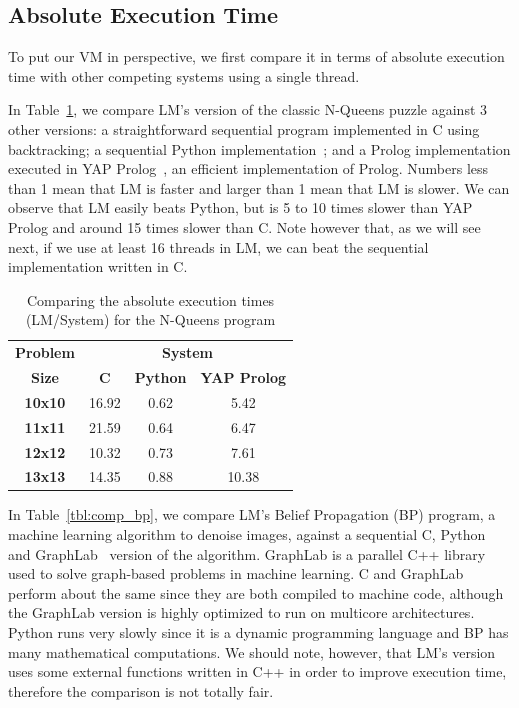\documentclass{sigplanconf}
\begin{document}
\subsection{Absolute Execution Time}

To put our VM in perspective, we first compare it in terms of absolute
execution time with other competing systems using a single thread.

In Table~\ref{tbl:comp_nqueens}, we compare LM's version of the
classic N-Queens puzzle against 3 other versions: a straightforward
sequential program implemented in C using backtracking; a sequential
Python implementation~\cite{vanRossum:1995:PRM}; and a Prolog
implementation executed in YAP
Prolog~\cite{DBLP:journals/corr/abs-1102-3896}, an efficient
implementation of Prolog. Numbers less than 1 mean that LM is faster
and larger than 1 mean that LM is slower. We can observe that LM
easily beats Python, but is 5 to 10 times slower than YAP Prolog and
around 15 times slower than C. Note however that, as we will see next,
if we use at least 16 threads in LM, we can beat the sequential
implementation written in C.

\begin{table}[ht]
\centering
{\begin{tabular}{c|c|c|c}
\textbf{Problem} & \multicolumn{3}{c}{\textbf{System}} \\
\textbf{Size} & \textbf{C} & \textbf{Python} & \textbf{YAP Prolog} \\
\hline\hline
\textbf{10x10} & 16.92 & 0.62 & 5.42 \\
\textbf{11x11} & 21.59 & 0.64 & 6.47 \\
\textbf{12x12} & 10.32 & 0.73 & 7.61 \\
\textbf{13x13} & 14.35 & 0.88 & 10.38 \\
\end{tabular}}
\caption{Comparing the absolute execution times (LM/System) for the
  N-Queens program}
\label{tbl:comp_nqueens}
\end{table}

In Table~\ref{tbl:comp_bp}, we compare LM's Belief Propagation (BP)
program, a machine learning algorithm to denoise images, against a
sequential C, Python and GraphLab~\cite{GraphLab2010} version of the
algorithm. GraphLab is a parallel C++ library used to solve
graph-based problems in machine learning. C and GraphLab perform about
the same since they are both compiled to machine code, although
the GraphLab version is highly optimized to run on multicore architectures.
Python runs very slowly since it is a
dynamic programming language and BP has many mathematical
computations. We should note, however, that LM's version uses some
external functions written in C++ in order to improve execution time,
therefore the comparison is not totally fair.
\end{document}
